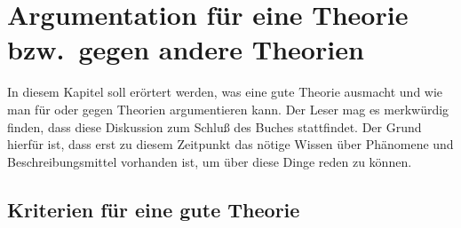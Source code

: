 
\chapter{Argumentation für eine Theorie bzw.\ gegen andere Theorien}
\label{Kapitel-argumentation}


In diesem Kapitel soll erörtert werden, was eine gute Theorie ausmacht
und wie man für oder gegen Theorien argumentieren kann. Der Leser mag
es merkwürdig finden, dass diese Diskussion zum Schluß des Buches stattfindet.
Der Grund hierfür ist, dass erst zu diesem Zeitpunkt das nötige Wissen
über Phänomene und Beschreibungsmittel vorhanden ist, um über diese Dinge reden
zu können.


\section{Kriterien für eine gute Theorie}
\label{sec-kriterien}

